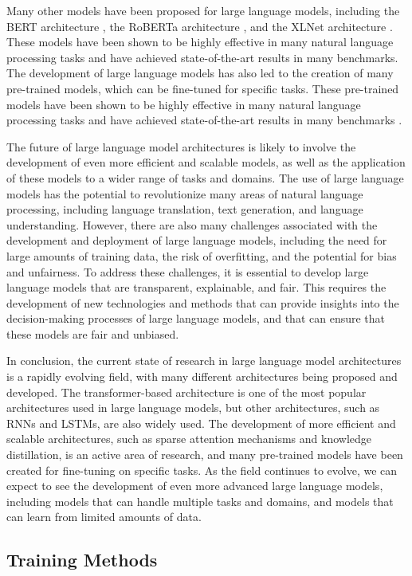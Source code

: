 \documentclass[11pt]{article}
\begin{document}
Many other models have been proposed for large language models, including the BERT architecture \cite{ref63}, the RoBERTa architecture \cite{ref1}, and the XLNet architecture \cite{ref64}. These models have been shown to be highly effective in many natural language processing tasks and have achieved state-of-the-art results in many benchmarks. The development of large language models has also led to the creation of many pre-trained models, which can be fine-tuned for specific tasks. These pre-trained models have been shown to be highly effective in many natural language processing tasks and have achieved state-of-the-art results in many benchmarks \cite{ref60}.

The future of large language model architectures is likely to involve the development of even more efficient and scalable models, as well as the application of these models to a wider range of tasks and domains. The use of large language models has the potential to revolutionize many areas of natural language processing, including language translation, text generation, and language understanding. However, there are also many challenges associated with the development and deployment of large language models, including the need for large amounts of training data, the risk of overfitting, and the potential for bias and unfairness. To address these challenges, it is essential to develop large language models that are transparent, explainable, and fair. This requires the development of new technologies and methods that can provide insights into the decision-making processes of large language models, and that can ensure that these models are fair and unbiased.

In conclusion, the current state of research in large language model architectures is a rapidly evolving field, with many different architectures being proposed and developed. The transformer-based architecture is one of the most popular architectures used in large language models, but other architectures, such as RNNs and LSTMs, are also widely used. The development of more efficient and scalable architectures, such as sparse attention mechanisms and knowledge distillation, is an active area of research, and many pre-trained models have been created for fine-tuning on specific tasks. As the field continues to evolve, we can expect to see the development of even more advanced large language models, including models that can handle multiple tasks and domains, and models that can learn from limited amounts of data.

\subsection{Training Methods}
\end{document}
